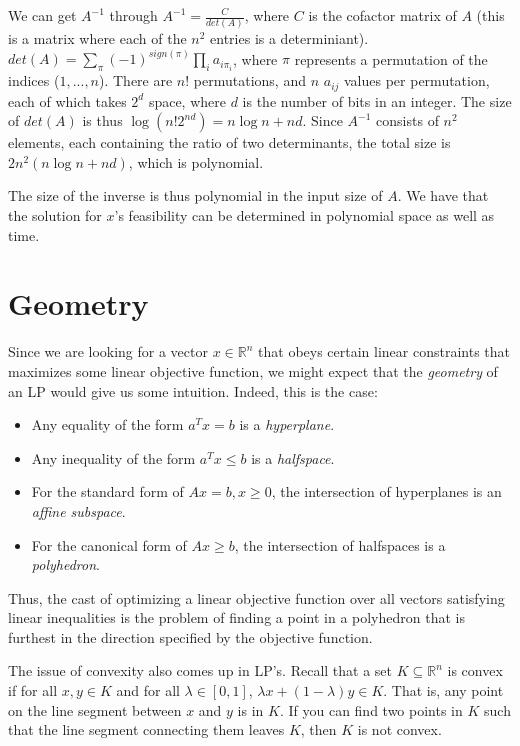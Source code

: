 \documentclass{article}
\newcommand{\reals}{\ensuremath{\mathbb{R}}}
\begin{document}
We can get $A^{-1}$ through $A^{-1} = \frac{C}{det(A)}$, where $C$ is the
cofactor matrix of $A$ (this is a matrix where each of the $n^2$ entries
is a determiniant).  $det(A) = \sum_\pi{(-1)^{sign(\pi)} \prod_i{a_{i
\pi_i}}}$, where $\pi$ represents a permutation of the indices
($1,...,n$). There are $n!$ permutations, and $n$ $a_{ij}$ values per
permutation, each of which takes $2^d$ space, where $d$ is the number of
bits in an integer.  The size of $det(A)$ is thus
$\log (n!2^{nd}) = n\log n + nd$.  Since $A^{-1}$ consists of $n^2$
elements, each containing the ratio of two determinants, the total size is
$2n^2(n\log n + nd)$, which is polynomial.

The size of the inverse is thus polynomial in the input size of $A$.  We have that the solution for $x$'s feasibility can be determined in polynomial space as well as time.  

\section{Geometry}

Since we are looking for a vector $x \in \reals^n$ that obeys certain
linear constraints that maximizes some linear objective function, we
might expect that the \emph{geometry} of an LP would give us some
intuition.  Indeed, this is the case:

\begin{itemize}
\item Any equality of the form $a^T x = b$ is a \emph{hyperplane}.
\item Any inequality of the form $a^T x \leq b$ is a \emph{halfspace}.
\item For the standard form of $Ax = b, x\geq 0$, the intersection of 
  hyperplanes is an \emph{affine subspace}.
\item For the canonical form of $Ax \geq b$, the intersection
  of halfspaces is a \emph{polyhedron}.
\end{itemize}

Thus, the cast of optimizing a linear objective function over all
vectors satisfying linear inequalities is the problem of finding a
point in a polyhedron that is furthest in the direction specified by
the objective function.

The issue of convexity also comes up in LP's.  Recall that a set $K
\subseteq \reals^n$ is convex if for all $x,y \in K$ and for all
$\lambda \in [0,1]$, $\lambda x + (1-\lambda) y \in K$.  That is, any
point on the line segment between $x$ and $y$ is in $K$.  If you can find two points in $K$ such that the line segment connecting them leaves $K$, then $K$ is not convex.  
\end{document}
